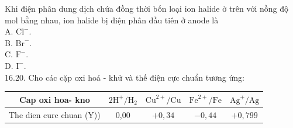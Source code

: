 \documentclass[10pt]{article}
\begin{document}
Khi điện phân dung dịch chứa đồng thời bốn loại ion halide ở trên với nồng độ mol bằng nhau, ion halide bị điện phân đầu tiên ở anode là\\
A. $\mathrm{Cl}^{-}$.\\
B. $\mathrm{Br}^{-}$.\\
C. $\mathrm{F}^{-}$.\\
D. $\mathrm{I}^{-}$.\\
16.20. Cho các cặp oxi hoá - khử và thế điện cực chuẩn tương ứng:

\begin{center}
\begin{tabular}{|c|c|c|c|c|}
\hline
Cap oxi hoa- kno & $2 \mathrm{H}^{+} / \mathrm{H}_{2}$ & $\mathrm{Cu}^{2+} / \mathrm{Cu}$ & $\mathrm{Fe}^{2+} / \mathrm{Fe}$ & $\mathrm{Ag}^{+} / \mathrm{Ag}$ \\
\hline
The dien curc chuan (Y)) & 0,00 & $+0,34$ & $-0,44$ & $+0,799$ \\
\hline
\end{tabular}
\end{center}
\end{document}
